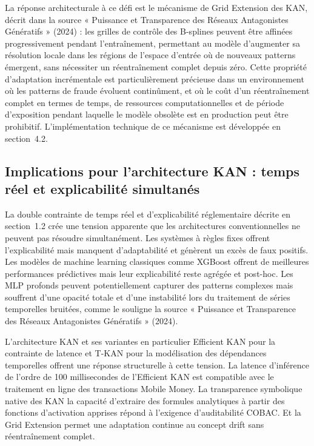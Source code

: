 \documentclass[11pt,a4paper,oneside]{report}
\theoremstyle{definition}
\theoremstyle{remark}
\begin{document}
La réponse architecturale à ce défi est le mécanisme de Grid Extension des KAN, décrit dans la source « Puissance et Transparence des Réseaux Antagonistes Génératifs » (2024) : les grilles de contrôle des B-splines peuvent être affinées progressivement pendant l'entraînement, permettant au modèle d'augmenter sa résolution locale dans les régions de l'espace d'entrée où de nouveaux patterns émergent, sans nécessiter un réentraînement complet depuis zéro. Cette propriété d'adaptation incrémentale est particulièrement précieuse dans un environnement où les patterns de fraude évoluent continûment, et où le coût d'un réentraînement complet  en termes de temps, de ressources computationnelles et de période d'exposition pendant laquelle le modèle obsolète est en production  peut être prohibitif. L'implémentation technique de ce mécanisme est développée en section~4.2.

\subsection{Implications pour l'architecture KAN : temps réel et explicabilité simultanés}

La double contrainte de temps réel et d'explicabilité réglementaire  décrite en section~1.2  crée une tension apparente que les architectures conventionnelles ne peuvent pas résoudre simultanément. Les systèmes à règles fixes offrent l'explicabilité mais manquent d'adaptabilité et génèrent un excès de faux positifs. Les modèles de machine learning classiques comme XGBoost offrent de meilleures performances prédictives mais leur explicabilité reste agrégée et post-hoc. Les MLP profonds peuvent potentiellement capturer des patterns complexes mais souffrent d'une opacité totale et d'une instabilité lors du traitement de séries temporelles bruitées, comme le souligne la source « Puissance et Transparence des Réseaux Antagonistes Génératifs » (2024).

L'architecture KAN et ses variantes  en particulier Efficient KAN pour la contrainte de latence et T-KAN pour la modélisation des dépendances temporelles  offrent une réponse structurelle à cette tension. La latence d'inférence de l'ordre de 100 millisecondes de l'Efficient KAN est compatible avec le traitement en ligne des transactions Mobile Money. La transparence symbolique native des KAN  la capacité d'extraire des formules analytiques à partir des fonctions d'activation apprises  répond à l'exigence d'auditabilité COBAC. Et la Grid Extension permet une adaptation continue au concept drift sans réentraînement complet.
\end{document}
